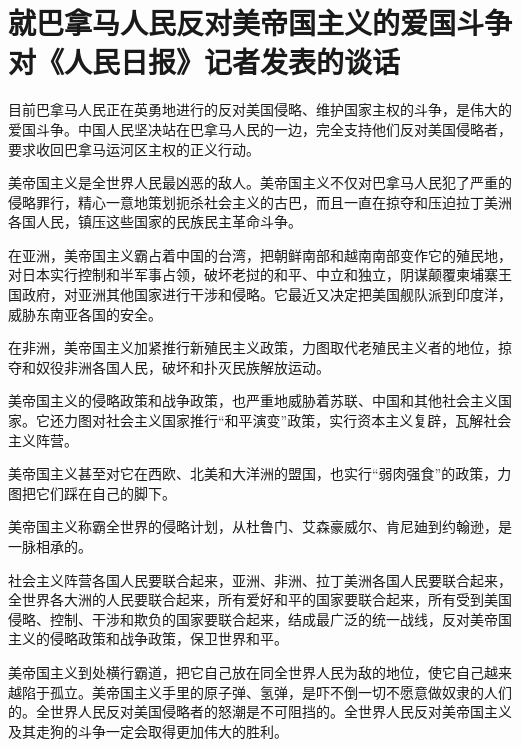 \section[就巴拿马人民反对美帝国主义的爱国斗争对《人民日报》记者发表的谈话（一九六四年一月十二日）]{就巴拿马人民反对美帝国主义的爱国斗争对《人民日报》记者发表的谈话}


目前巴拿马人民正在英勇地进行的反对美国侵略、维护国家主权的斗争，是伟大的爱国斗争。中国人民坚决站在巴拿马人民的一边，完全支持他们反对美国侵略者，要求收回巴拿马运河区主权的正义行动。

美帝国主义是全世界人民最凶恶的敌人。美帝国主义不仅对巴拿马人民犯了严重的侵略罪行，精心一意地策划扼杀社会主义的古巴，而且一直在掠夺和压迫拉丁美洲各国人民，镇压这些国家的民族民主革命斗争。

在亚洲，美帝国主义霸占着中国的台湾，把朝鲜南部和越南南部变作它的殖民地，对日本实行控制和半军事占领，破坏老挝的和平、中立和独立，阴谋颠覆柬埔寨王国政府，对亚洲其他国家进行干涉和侵略。它最近又决定把美国舰队派到印度洋，威胁东南亚各国的安全。

在非洲，美帝国主义加紧推行新殖民主义政策，力图取代老殖民主义者的地位，掠夺和奴役非洲各国人民，破坏和扑灭民族解放运动。

美帝国主义的侵略政策和战争政策，也严重地威胁着苏联、中国和其他社会主义国家。它还力图对社会主义国家推行“和平演变”政策，实行资本主义复辟，瓦解社会主义阵营。

美帝国主义甚至对它在西欧、北美和大洋洲的盟国，也实行“弱肉强食”的政策，力图把它们踩在自己的脚下。

美帝国主义称霸全世界的侵略计划，从杜鲁门、艾森豪威尔、肯尼廸到约翰逊，是一脉相承的。

社会主义阵营各国人民要联合起来，亚洲、非洲、拉丁美洲各国人民要联合起来，全世界各大洲的人民要联合起来，所有爱好和平的国家要联合起来，所有受到美国侵略、控制、干涉和欺负的国家要联合起来，结成最广泛的统一战线，反对美帝国主义的侵略政策和战争政策，保卫世界和平。

美帝国主义到处横行霸道，把它自己放在同全世界人民为敌的地位，使它自己越来越陷于孤立。美帝国主义手里的原子弹、氢弹，是吓不倒一切不愿意做奴隶的人们的。全世界人民反对美国侵略者的怒潮是不可阻挡的。全世界人民反对美帝国主义及其走狗的斗争一定会取得更加伟大的胜利。


